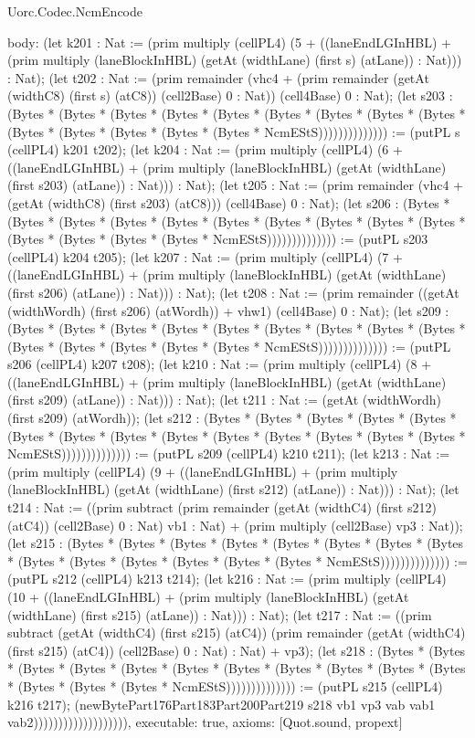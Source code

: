 \begin{lexlean}{Uorc.Codec.NcmEncode}
\begin{semanticmodule}
{  body: (let k201 : Nat := (prim multiply (cellPL4) (5 + ((laneEndLGInHBL) + (prim multiply (laneBlockInHBL) (getAt (widthLane) (first s) (atLane)) : Nat))) : Nat); (let t202 : Nat := (prim remainder (vhc4 + (prim remainder (getAt (widthC8) (first s) (atC8)) (cell2Base) 0 : Nat)) (cell4Base) 0 : Nat); (let s203 : (Bytes * (Bytes * (Bytes * (Bytes * (Bytes * (Bytes * (Bytes * (Bytes * (Bytes * (Bytes * (Bytes * (Bytes * (Bytes * (Bytes * NcmEStS)))))))))))))) := (putPL s (cellPL4) k201 t202); (let k204 : Nat := (prim multiply (cellPL4) (6 + ((laneEndLGInHBL) + (prim multiply (laneBlockInHBL) (getAt (widthLane) (first s203) (atLane)) : Nat))) : Nat); (let t205 : Nat := (prim remainder (vhc4 + (getAt (widthC8) (first s203) (atC8))) (cell4Base) 0 : Nat); (let s206 : (Bytes * (Bytes * (Bytes * (Bytes * (Bytes * (Bytes * (Bytes * (Bytes * (Bytes * (Bytes * (Bytes * (Bytes * (Bytes * (Bytes * NcmEStS)))))))))))))) := (putPL s203 (cellPL4) k204 t205); (let k207 : Nat := (prim multiply (cellPL4) (7 + ((laneEndLGInHBL) + (prim multiply (laneBlockInHBL) (getAt (widthLane) (first s206) (atLane)) : Nat))) : Nat); (let t208 : Nat := (prim remainder ((getAt (widthWordh) (first s206) (atWordh)) + vhw1) (cell4Base) 0 : Nat); (let s209 : (Bytes * (Bytes * (Bytes * (Bytes * (Bytes * (Bytes * (Bytes * (Bytes * (Bytes * (Bytes * (Bytes * (Bytes * (Bytes * (Bytes * NcmEStS)))))))))))))) := (putPL s206 (cellPL4) k207 t208); (let k210 : Nat := (prim multiply (cellPL4) (8 + ((laneEndLGInHBL) + (prim multiply (laneBlockInHBL) (getAt (widthLane) (first s209) (atLane)) : Nat))) : Nat); (let t211 : Nat := (getAt (widthWordh) (first s209) (atWordh)); (let s212 : (Bytes * (Bytes * (Bytes * (Bytes * (Bytes * (Bytes * (Bytes * (Bytes * (Bytes * (Bytes * (Bytes * (Bytes * (Bytes * (Bytes * NcmEStS)))))))))))))) := (putPL s209 (cellPL4) k210 t211); (let k213 : Nat := (prim multiply (cellPL4) (9 + ((laneEndLGInHBL) + (prim multiply (laneBlockInHBL) (getAt (widthLane) (first s212) (atLane)) : Nat))) : Nat); (let t214 : Nat := ((prim subtract (prim remainder (getAt (widthC4) (first s212) (atC4)) (cell2Base) 0 : Nat) vb1 : Nat) + (prim multiply (cell2Base) vp3 : Nat)); (let s215 : (Bytes * (Bytes * (Bytes * (Bytes * (Bytes * (Bytes * (Bytes * (Bytes * (Bytes * (Bytes * (Bytes * (Bytes * (Bytes * (Bytes * NcmEStS)))))))))))))) := (putPL s212 (cellPL4) k213 t214); (let k216 : Nat := (prim multiply (cellPL4) (10 + ((laneEndLGInHBL) + (prim multiply (laneBlockInHBL) (getAt (widthLane) (first s215) (atLane)) : Nat))) : Nat); (let t217 : Nat := ((prim subtract (getAt (widthC4) (first s215) (atC4)) (prim remainder (getAt (widthC4) (first s215) (atC4)) (cell2Base) 0 : Nat) : Nat) + vp3); (let s218 : (Bytes * (Bytes * (Bytes * (Bytes * (Bytes * (Bytes * (Bytes * (Bytes * (Bytes * (Bytes * (Bytes * (Bytes * (Bytes * (Bytes * NcmEStS)))))))))))))) := (putPL s215 (cellPL4) k216 t217); (newBytePart176Part183Part200Part219 s218 vb1 vp3 vab vab1 vab2))))))))))))))))))),
  executable: true,
  axioms: [Quot.sound, propext]
}


\end{semanticmodule}
\end{lexlean}

